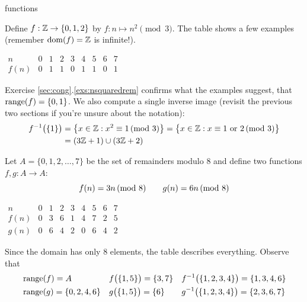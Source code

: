 \begin{examples}{}{functions}
\begin{enumerate}
	\begin{minipage}[t]{0.64\linewidth}\vspace{0pt}
		\item Define $f:\mathbb{Z}\to\{0,1,2\}$ by $f:n\mapsto n^2\pmod 3$. The table shows a few examples (remember $\operatorname{dom}(f)=\mathbb{Z}$ is infinite!).
	\end{minipage}
	\hfill
	\begin{minipage}[t]{0.35\linewidth}\vspace{0pt}
		\flushright
		$\begin{array}{c|cccccccc}
  		n&0&1&2&3&4&5&6&7\\\hline
  		f(n)&0&1&1&0&1&1&0&1
  	\end{array}$
	\end{minipage}\par
		Exercise \ref*{sec:cong}.\ref{exs:nsquaredrem} confirms what the examples suggest, that $\operatorname{range}(f)=\{0,1\}$. We also compute a single inverse image (revisit the previous two sections if you're unsure about the notation):
		\begin{align*}
			f^{-1}\bigl(\{1\}\bigr) &=\bigl\{x\in\mathbb{Z}:x^2\equiv 1\negthickspace\pmod{3}\bigr\} =\bigl\{x\in\mathbb{Z}:x\equiv 1\text{ or }2\negthickspace\pmod{3}\bigr\}\\
			&=(3\mathbb{Z}+1)\cup(3\mathbb{Z}+2)
		\end{align*}

  \begin{minipage}[t]{0.64\linewidth}\vspace{0pt}
    \item\label{ex:functmod} Let $A=\{0,1,2,\ldots,7\}$ be the set of remainders modulo 8 and define two functions $f,g:A\to A$:
    \[
    	f(n)=3n\negthickspace\pmod{8}\qquad g(n)=6n\negthickspace\pmod{8}
    \]
  \end{minipage}
  \hfill
  \begin{minipage}[t]{0.35\linewidth}\vspace{0pt}
  	\flushright
  	$\begin{array}{c|cccccccccc}
  		n&0&1&2&3&4&5&6&7\\\hline
  		f(n)&0&3&6&1&4&7&2&5\\\hline
  		g(n)&0&6&4&2&0&6&4&2
  	\end{array}$	
  \end{minipage}
  \smallbreak
  Since the domain has only 8 elements, the table describes everything. Observe that
  \begin{align*}
  	&\operatorname{range}(f)=A &&f\bigl(\{1,5\}\bigr) =\{3,7\} &&f^{-1}\bigl(\{1,2,3,4\}\bigr) =\{1,3,4,6\}\\
  	&\operatorname{range}(g)=\{0,2,4,6\} &&g\bigl(\{1,5\}\bigr) =\{6\} &&g^{-1}\bigl(\{1,2,3,4\}\bigr) =\{2,3,6,7\}
  \end{align*}
  	

\end{enumerate}
\end{examples}
